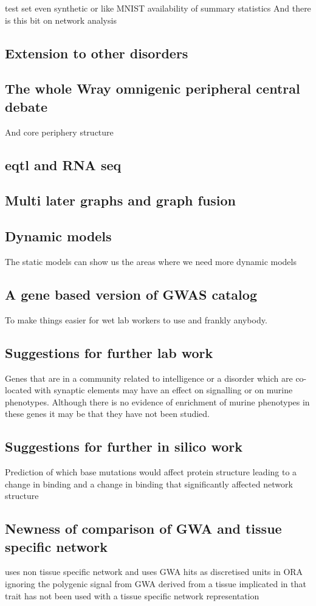\cite{kim2018experimenting}
test set even synthetic or like MNIST
availability of summary statistics
And there is this bit on network analysis\cite{flint2019great}
 \subsection{Extension to other disorders}
 \subsection{The whole Wray omnigenic peripheral central debate}
 And core periphery structure
 \subsection{eqtl and RNA seq}
 \subsection{Multi later graphs and graph fusion}
 \subsection{Dynamic models}
 The static models can show us the areas where we need more dynamic models 
 \subsection{A gene based version of GWAS catalog}
 To make things easier for wet lab workers to use and frankly anybody. 
 \subsection{Suggestions for further lab work}
 Genes that are in a community related to intelligence or a disorder which are co-located with synaptic elements may have an effect on signalling or on murine phenotypes. Although there is no evidence of enrichment of murine phenotypes in these genes it may be that they have not been studied. 
 
 \subsection{Suggestions for further in silico work}
 Prediction of which base mutations would affect protein structure leading to a change in binding and a change in binding that significantly affected network structure
\subsection{Newness of comparison of GWA and tissue specific network}
\label{sec:comparison with previous studies}
\cite{ghiassian2015disease} uses non tissue specific network and uses GWA hits as discretised units in ORA ignoring the polygenic signal from GWA
derived from a tissue implicated in that trait has not been used with a tissue specific network representation

